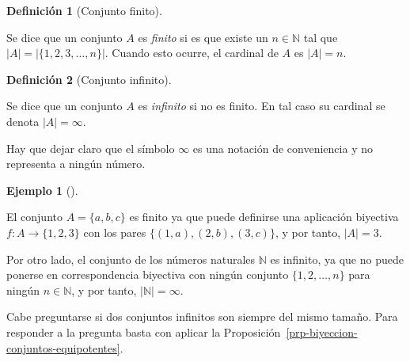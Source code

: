 \documentclass[
  a4paper,
]{scrreport}
\theoremstyle{definition}
\newtheorem{definition}{Definición}[chapter]
\theoremstyle{plain}
\theoremstyle{plain}
\theoremstyle{definition}
\theoremstyle{definition}
\newtheorem{example}{Ejemplo}[chapter]
\theoremstyle{plain}
\theoremstyle{remark}
\begin{document}
\begin{definition}[Conjunto
finito]\protect\hypertarget{def-conjunto-finito}{}\label{def-conjunto-finito}

Se dice que un conjunto \(A\) es \emph{finito} si es que existe un
\(n\in\mathbb{N}\) tal que \(|A| = |\{1,2,3,\ldots,n \}|\). Cuando esto
ocurre, el cardinal de \(A\) es \(|A|=n\).

\end{definition}

\begin{definition}[Conjunto
infinito]\protect\hypertarget{def-conjunto-infinito}{}\label{def-conjunto-infinito}

Se dice que un conjunto \(A\) es \emph{infinito} si no es finito. En tal
caso su cardinal se denota \(|A|=\infty\).

\end{definition}

\begin{tcolorbox}[enhanced jigsaw, breakable, title=\textcolor{quarto-callout-warning-color}{\faExclamationTriangle}\hspace{0.5em}{Advertencia}, toprule=.15mm, coltitle=black, arc=.35mm, rightrule=.15mm, colframe=quarto-callout-warning-color-frame, colbacktitle=quarto-callout-warning-color!10!white, toptitle=1mm, titlerule=0mm, leftrule=.75mm, opacityback=0, colback=white, bottomrule=.15mm, bottomtitle=1mm, left=2mm, opacitybacktitle=0.6]

Hay que dejar claro que el símbolo \(\infty\) es una notación de
conveniencia y no representa a ningún número.

\end{tcolorbox}

\begin{example}[]\protect\hypertarget{exm-conjunto-finito-infinito}{}\label{exm-conjunto-finito-infinito}

El conjunto \(A=\{a, b, c\}\) es finito ya que puede definirse una
aplicación biyectiva \(f:A\rightarrow \{1, 2, 3\}\) con los pares
\(\{(1,a),(2,b), (3,c)\}\), y por tanto, \(|A| = 3\).

Por otro lado, el conjunto de los números naturales \(\mathbb{N}\) es
infinito, ya que no puede ponerse en correspondencia biyectiva con
ningún conjunto \(\{1,2,\ldots,n\}\) para ningún \(n\in\mathbb{N}\), y
por tanto, \(|\mathbb{N}|=\infty\).

\end{example}

Cabe preguntarse si dos conjuntos infinitos son siempre del mismo
tamaño. Para responder a la pregunta basta con aplicar la
Proposición~\ref{prp-biyeccion-conjuntos-equipotentes}.
\end{document}
